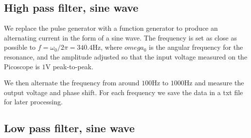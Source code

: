 \documentclass[../main/main.tex]{subfiles}
\begin{document}
\subsection*{High pass filter, sine wave}

We replace the pulse generator with a function generator to produce an alternating current in the form of a sine wave.
The frequency is set as close as possible to \(  f = \omega_0 / 2 \pi = 340.4 \si{\hertz} \), where \( omega_0 \) is the angular frequency for the resonance, and the amplitude adjusted so that the input voltage measured on the Picoscope is \( 1 \si{\volt} \) peak-to-peak.

We then alternate the frequency from around \( 100 \si{\hertz} \) to \( 1000 \si{\hertz} \) and measure the output voltage and phase shift.
For each frequency we save the data in a txt file for later processing.


\subsection{Low pass filter, sine wave}
\end{document}
